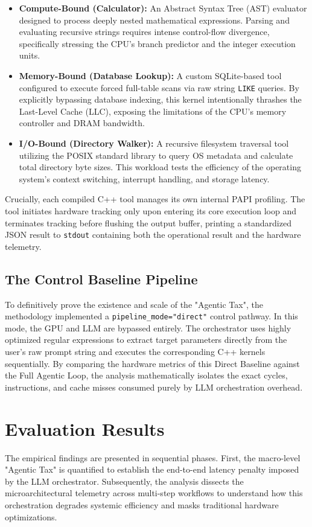 \documentclass[10pt, letterpaper]{article}
\begin{document}
\begin{itemize}
\item \textbf{Compute-Bound (Calculator):} An Abstract Syntax Tree (AST) evaluator designed to process deeply nested mathematical expressions. Parsing and evaluating recursive strings requires intense control-flow divergence, specifically stressing the CPU's branch predictor and the integer execution units.
\item \textbf{Memory-Bound (Database Lookup):} A custom SQLite-based tool configured to execute forced full-table scans via raw string \texttt{LIKE} queries. By explicitly bypassing database indexing, this kernel intentionally thrashes the Last-Level Cache (LLC), exposing the limitations of the CPU's memory controller and DRAM bandwidth.
\item \textbf{I/O-Bound (Directory Walker):} A recursive filesystem traversal tool utilizing the POSIX standard library to query OS metadata and calculate total directory byte sizes. This workload tests the efficiency of the operating system's context switching, interrupt handling, and storage latency.
\end{itemize}

Crucially, each compiled C++ tool manages its own internal PAPI profiling. The tool initiates hardware tracking only upon entering its core execution loop and terminates tracking before flushing the output buffer, printing a standardized JSON result to \texttt{stdout} containing both the operational result and the hardware telemetry.

\subsection{The Control Baseline Pipeline}
To definitively prove the existence and scale of the "Agentic Tax", the methodology implemented a \texttt{pipeline\_mode="direct"} control pathway. In this mode, the GPU and LLM are bypassed entirely. The orchestrator uses highly optimized regular expressions to extract target parameters directly from the user's raw prompt string and executes the corresponding C++ kernels sequentially. By comparing the hardware metrics of this Direct Baseline against the Full Agentic Loop, the analysis mathematically isolates the exact cycles, instructions, and cache misses consumed purely by LLM orchestration overhead.

\section{Evaluation Results}
The empirical findings are presented in sequential phases. First, the macro-level "Agentic Tax" is quantified to establish the end-to-end latency penalty imposed by the LLM orchestrator. Subsequently, the analysis dissects the microarchitectural telemetry across multi-step workflows to understand how this orchestration degrades systemic efficiency and masks traditional hardware optimizations.
\end{document}
